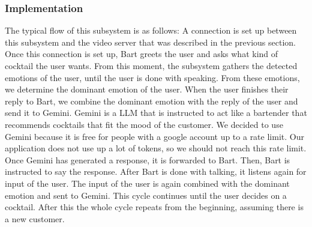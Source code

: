 \documentclass[conference]{IEEEtran}
\begin{document}
\subsubsection{Implementation}
The typical flow of this subsystem is as follows: 
A connection is set up between this subsystem and the video server that was described in the previous section.
Once this connection is set up, Bart greets the user and asks what kind of cocktail the user wants.
From this moment, the subsystem gathers the detected emotions of the user, until the user is done with speaking.
From these emotions, we determine the dominant emotion of the user.
When the user finishes their reply to Bart, we combine the dominant emotion with the reply of the user and send it to Gemini.
Gemini is a LLM that is instructed to act like a bartender that recommends cocktails that fit the mood of the customer.
We decided to use Gemini because it is free for people with a google account up to a rate limit.
Our application does not use up a lot of tokens, so we should not reach this rate limit.
Once Gemini has generated a response, it is forwarded to Bart.
Then, Bart is instructed to say the response.
After Bart is done with talking, it listens again for input of the user. 
The input of the user is again combined with the dominant emotion and sent to Gemini.
This cycle continues until the user decides on a cocktail.
After this the whole cycle repeats from the beginning, assuming there is a new customer.

\end{document}
